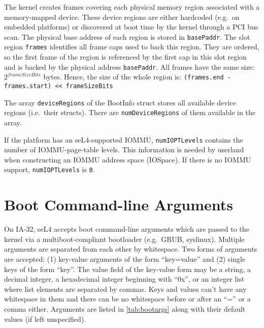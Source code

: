 The kernel creates frames covering each physical memory region associated with
a memory-mapped device. These device regions are either hardcoded (e.g.\ on
embedded platforms) or discovered at boot time by the kernel through a PCI bus
scan. The physical base address of each region is stored in \texttt{basePaddr}.
The slot region \texttt{frames} identifies all frame caps used to back this
region. They are ordered, so the first frame of the region is referenced by the
first cap in this slot region and is backed by the physical address
\texttt{basePaddr}. All frames have the same size: $2^{frameSizeBits}$ bytes.
Hence, the size of the whole region is:
\texttt{(frames.end - frames.start) << frameSizeBits}

The array \texttt{deviceRegions} of the BootInfo struct stores all available
device regions (i.e.\ their structs). There are \texttt{numDeviceRegions} of
them available in the array.

If the platform has an seL4-supported IOMMU, \texttt{numIOPTLevels} contains
the number of IOMMU-page-table levels. This information is needed by userland
when constructing an IOMMU address space (IOSpace). If there is no IOMMU
support, \texttt{numIOPTLevels} is \texttt{0}.

\ifxeightsix
\section{Boot Command-line Arguments}

On IA-32, seL4 accepts boot command-line arguments which are passed to the
kernel via a multiboot-compliant bootloader (e.g.\ GRUB, syslinux). Multiple
arguments are separated from each other by whitespace. Two forms of arguments
are accepted:
(1) key-value arguments of the form ``key=value'' and (2) single keys of the
form ``key''. The value field of the key-value form may be a string, a decimal
integer, a hexadecimal integer beginning with ``0x'', or an integer list where
list elements are separated by commas.
Keys and values can't have any whitespace in them and there can be no
whitespace before or after an ``='' or a comma either.
Arguments are listed in \autoref{tab:bootargs} along with their default values (if left unspecified).


